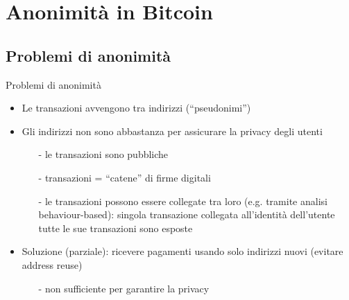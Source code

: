 \documentclass{beamer}
\begin{document}
  
  
  \section{Anonimità in Bitcoin}
  \subsection{Problemi di anonimità}
  \begin{frame}{Problemi di anonimità}
      \begin{itemize}
          \item Le transazioni avvengono tra indirizzi (``pseudonimi'')
          \item Gli indirizzi non sono abbastanza per assicurare la privacy degli utenti
          \begin{itemize}
              \item[-] le transazioni sono pubbliche 
              \item[-] transazioni = ``catene'' di firme digitali
              \item[-] le transazioni possono essere collegate tra loro (e.g. tramite analisi behaviour-based): singola transazione collegata all'identità dell'utente \MVRightarrow\, tutte le sue transazioni sono esposte
          \end{itemize}
          \item Soluzione (parziale): ricevere pagamenti usando solo indirizzi nuovi (evitare address reuse) 
          \begin{itemize}
              \item[-] non sufficiente per garantire la privacy  
          \end{itemize}
      \end{itemize}
  \end{frame}
  
  
  
\end{document}
